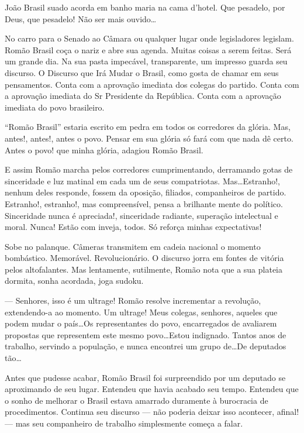 João Brasil suado acorda em banho maria na cama d'hotel. Que pesadelo, por Deus, que pesadelo! Não ser mais ouvido\ldots



No carro para o Senado ao Câmara ou qualquer lugar onde legisladores legislam. Romão Brasil coça o nariz e abre sua agenda. Muitas coisas a serem feitas. Será um grande dia. Na sua pasta impecável, transparente, um impresso guarda seu discurso. O Discurso que Irá Mudar o Brasil, como gosta de chamar em seus pensamentos. Conta com a aprovação imediata dos colegas do partido. Conta com a aprovação imediata do Sr Presidente da República. Conta com a aprovação imediata do povo brasileiro.

``Romão Brasil'' estaria escrito em pedra em todos os corredores da glória. Mas, antes!, antes!, antes o povo. Pensar em sua glória só fará com que nada dê certo. Antes o povo! que minha glória, adagiou Romão Brasil.

E assim Romão marcha pelos corredores cumprimentando, derramando gotas de sinceridade e luz matinal em cada um de seus compatriotas. Mas\ldots Estranho!, nenhum deles responde, fossem da oposição, filiados, companheiros de partido. Estranho!, estranho!, mas compreensível, pensa a brilhante mente do político. Sinceridade nunca é apreciada!, sinceridade radiante, superação intelectual e moral. Nunca! Estão com inveja, todos. Só reforça minhas expectativas!

Sobe no palanque. Câmeras transmitem em cadeia nacional o momento bombástico. Memorável. Revolucionário. O discurso jorra em fontes de vitória pelos altofalantes. Mas lentamente, sutilmente, Romão nota que a sua plateia dormita, sonha acordada, joga sudoku.

--- Senhores, isso é um ultrage! Romão resolve incrementar a revolução, extendendo-a ao momento. Um ultrage! Meus colegas, senhores, aqueles que podem mudar o país\ldots Os representantes do povo, encarregados de avaliarem propostas que representem este mesmo povo\ldots Estou indignado. Tantos anos de trabalho, servindo a população, e nunca encontrei um grupo de\ldots De deputados tão\ldots

Antes que pudesse acabar, Romão Brasil foi surpreendido por um deputado se aproximando de seu lugar. Entendeu que havia acabado seu tempo. Entendeu que o sonho de melhorar o Brasil estava amarrado duramente à burocracia de procedimentos. Continua seu discurso --- não poderia deixar isso acontecer, afinal! --- mas seu companheiro de trabalho simplesmente começa a falar.

